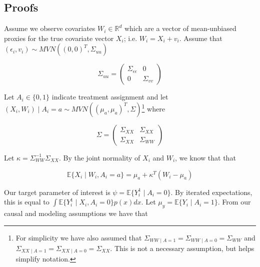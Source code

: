 \documentclass{article}
\begin{document}
\begin{appendix}

\section{Proofs}

Assume we observe covariates $W_i \in \mathbb{R}^d$ which are a vector of mean-unbiased proxies for the true covariate vector $X_i$; i.e. $W_i = X_i + v_i$. Assume that $(\epsilon_i, v_i) \sim MVN((0,0)^T, \Sigma_{uu})$ 

$$
\Sigma_{uu} = \begin{pmatrix} 
\Sigma_{\epsilon\epsilon} & 0 \\ 
0 & \Sigma_{vv} 
\end{pmatrix}
$$ 

Let $A_i \in \{0, 1\}$ indicate treatment assignment and let $(X_i, W_i) \mid A_i = a \sim MVN((\mu_a, \mu_a)^T, \Sigma)$\footnote{For simplicity we have also assumed that $\Sigma_{WW \mid A = 1} = \Sigma_{WW \mid A = 0} = \Sigma_{WW}$ and $\Sigma_{XX \mid A = 1} = \Sigma_{XX \mid A = 0} = \Sigma_{XX}$. This is not a necessary assumption, but helps simplify notation.}  where 

$$
\Sigma = \begin{pmatrix} 
\Sigma_{XX} & \Sigma_{XX} \\ 
\Sigma_{XX} & \Sigma_{WW}  
\end{pmatrix}
$$ 

Let $\kappa = \Sigma_{WW}^{-1}\Sigma_{XX}$. By the joint normality of $X_i$ and $W_i$, we know that that 

$$
\mathbb{E}\{X_i \mid W_i, A_i = a\} = \mu_a + \kappa^T(W_i - \mu_a)
$$

Our target parameter of interest is $\psi = \mathbb{E}\{Y_i^1 \mid A_i = 0\}$. By iterated expectations, this is equal to $\int \mathbb{E}\{Y_i^1 \mid X_i, A_i = 0\}p(x)dx$. Let $\mu_y = \mathbb{E}\{Y_i \mid A_i = 1\}$. From our causal and modeling assumptions we have that


\end{appendix}
\end{document}
